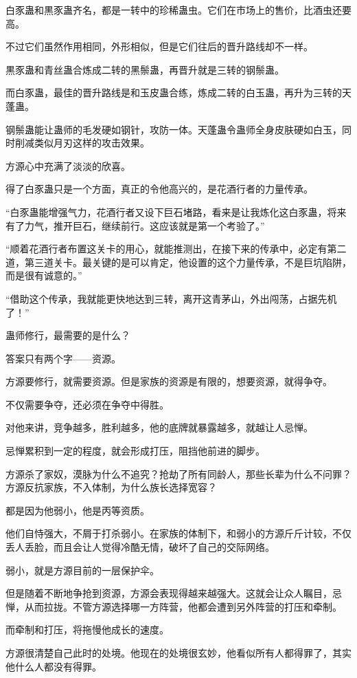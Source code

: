 \begin{this_body}
白豕蛊和黒豕蛊齐名，都是一转中的珍稀蛊虫。它们在市场上的售价，比酒虫还要高。

不过它们虽然作用相同，外形相似，但是它们往后的晋升路线却不一样。

黒豕蛊和青丝蛊合炼成二转的黑鬃蛊，再晋升就是三转的钢鬃蛊。

而白豕蛊，最佳的晋升路线是和玉皮蛊合练，炼成二转的白玉蛊，再升为三转的天蓬蛊。

钢鬃蛊能让蛊师的毛发硬如钢针，攻防一体。天蓬蛊令蛊师全身皮肤硬如白玉，同时削减类似月刃这样的攻击效果。

方源心中充满了淡淡的欣喜。

得了白豕蛊只是一个方面，真正的令他高兴的，是花酒行者的力量传承。

“白豕蛊能增强气力，花酒行者又设下巨石堵路，看来是让我炼化这白豕蛊，将来有了力气，推开巨石，继续前行。这应该就是第一个考验了。”

“顺着花酒行者布置这关卡的用心，就能推测出，在接下来的传承中，必定有第二道，第三道关卡。最关键的是可以肯定，他设置的这个力量传承，不是巨坑陷阱，而是很有诚意的。”

“借助这个传承，我就能更快地达到三转，离开这青茅山，外出闯荡，占据先机了！”

蛊师修行，最需要的是什么？

答案只有两个字——资源。

方源要修行，就需要资源。但是家族的资源是有限的，想要资源，就得争夺。

不仅需要争夺，还必须在争夺中得胜。

对他来讲，竞争越多，胜利越多，他的底牌就暴露越多，就越让人忌惮。

忌惮累积到一定的程度，就会形成打压，阻挡他前进的脚步。

方源杀了家奴，漠脉为什么不追究？抢劫了所有同龄人，那些长辈为什么不问罪？方源反抗家族，不入体制，为什么族长选择宽容？

都是因为他弱小，他是丙等资质。

他们自恃强大，不屑于打杀弱小。在家族的体制下，和弱小的方源斤斤计较，不仅丢人丢脸，而且会让人觉得冷酷无情，破坏了自己的交际网络。

弱小，就是方源目前的一层保护伞。

但是随着不断地争抢到资源，方源会表现得越来越强大。这就会让众人瞩目，忌惮，从而拉拢。不管方源选择哪一方阵营，他都会遭到另外阵营的打压和牵制。

而牵制和打压，将拖慢他成长的速度。

方源很清楚自己此时的处境。他现在的处境很玄妙，他看似所有人都得罪了，其实他什么人都没有得罪。


\end{this_body}
